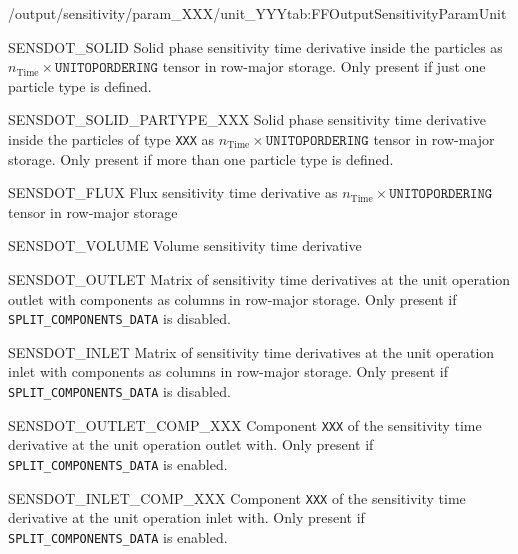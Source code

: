 \begin{groupscope}{/output/sensitivity/param\_XXX/unit\_YYY}{tab:FFOutputSensitivityParamUnit}
\begin{dataset}[type=double,unit={\si{\mol\per\cubic\metre\of{MP}\per\second\per\ParamUnit}}]{SENSDOT\_SOLID}
    Solid phase sensitivity time derivative inside the particles as $n_{\text{Time}} \times \texttt{UNITOPORDERING}$ tensor in row-major storage.
    Only present if just one particle type is defined.
  \end{dataset}
  \begin{dataset}[type=double,unit={\si{\mol\per\cubic\metre\of{SP}\per\second\per\ParamUnit}}]{SENSDOT\_SOLID\_PARTYPE\_XXX}
    Solid phase sensitivity time derivative inside the particles of type \texttt{XXX} as $n_{\text{Time}} \times \texttt{UNITOPORDERING}$ tensor in row-major storage.
    Only present if more than one particle type is defined.
  \end{dataset}
  \begin{dataset}[type=double,unit={\si{\mol\per\square\metre\per\square\second\per\ParamUnit}}]{SENSDOT\_FLUX}
    Flux sensitivity time derivative as $n_{\text{Time}} \times \texttt{UNITOPORDERING}$ tensor in row-major storage
  \end{dataset}
  \begin{dataset}[type=double,unit={\si{\cubic\per\second\metre\per\ParamUnit}}]{SENSDOT\_VOLUME}
    Volume sensitivity time derivative 
  \end{dataset}
  \begin{dataset}[type=double,unit={\si{\mol\per\cubic\metre\of{IV}\per\second\per\ParamUnit}}]{SENSDOT\_OUTLET}
    Matrix of sensitivity time derivatives at the unit operation outlet with components as columns in row-major storage.
    Only present if \texttt{SPLIT\_COMPONENTS\_DATA} is disabled.
  \end{dataset}
  \begin{dataset}[type=double,unit={\si{\mol\per\cubic\metre\of{IV}\per\second\per\ParamUnit}}]{SENSDOT\_INLET}
    Matrix of sensitivity time derivatives at the unit operation inlet with components as columns in row-major storage.
    Only present if \texttt{SPLIT\_COMPONENTS\_DATA} is disabled.
  \end{dataset}
  \begin{dataset}[type=double,unit={\si{\mol\per\cubic\metre\of{IV}\per\second\per\ParamUnit}}]{SENSDOT\_OUTLET\_COMP\_XXX}
    Component \texttt{XXX} of the sensitivity time derivative at the unit operation outlet with.
    Only present if \texttt{SPLIT\_COMPONENTS\_DATA} is enabled.
  \end{dataset}
  \begin{dataset}[type=double,unit={\si{\mol\per\cubic\metre\of{IV}\per\second\per\ParamUnit}}]{SENSDOT\_INLET\_COMP\_XXX}
    Component \texttt{XXX} of the sensitivity time derivative at the unit operation inlet with.
    Only present if \texttt{SPLIT\_COMPONENTS\_DATA} is enabled.
  \end{dataset}
\end{groupscope}

